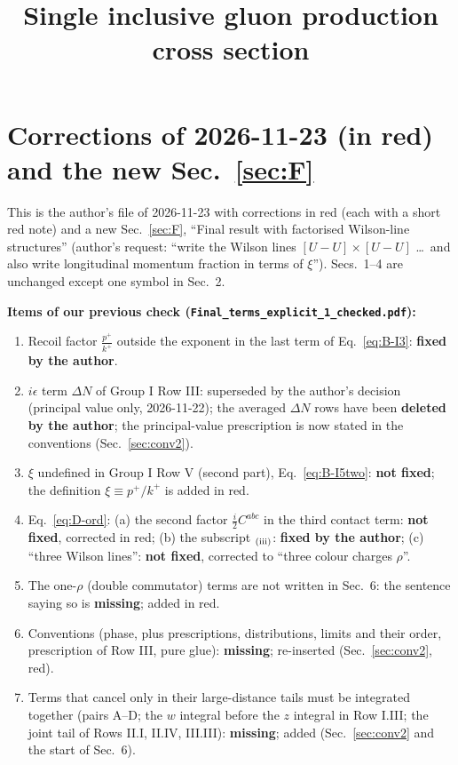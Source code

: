\documentclass[9pt]{article}
\title{Single inclusive gluon production cross section}
\author{}
\date{}
\numberwithin{equation}{section}
\begin{document}
\maketitle
{\color{red}
\section*{Corrections of 2026-11-23 (in red) and the new Sec.~\ref{sec:F}}
\noindent This is the author's file of 2026-11-23 with corrections in red (each with a short red note) and a new Sec.~\ref{sec:F}, ``Final result with factorised Wilson-line structures'' (author's request: ``write the Wilson lines $[U-U]\times[U-U]$ \dots\ and also write longitudinal momentum fraction in terms of $\xi$''). Secs.~1--4 are unchanged except one symbol in Sec.~2.

\noindent\textbf{Items of our previous check (\texttt{Final\_terms\_explicit\_1\_checked.pdf}):}
\begin{enumerate}
\item Recoil factor $\frac{p^{+}}{k^{+}}$ outside the exponent in the last term of Eq.~\eqref{eq:B-I3}: \textbf{fixed by the author}.
\item $i\epsilon$ term $\Delta N$ of Group I Row III: superseded by the author's decision (principal value only, 2026-11-22); the averaged $\Delta N$ rows have been \textbf{deleted by the author}; the principal-value prescription is now stated in the conventions (Sec.~\ref{sec:conv2}).
\item $\xi$ undefined in Group I Row V (second part), Eq.~\eqref{eq:B-I5two}: \textbf{not fixed}; the definition $\xi\equiv p^{+}/k^{+}$ is added in red.
\item Eq.~\eqref{eq:D-ord}: (a) the second factor $\frac{i}{2}C^{abc}$ in the third contact term: \textbf{not fixed}, corrected in red; (b) the subscript ${}_{\rm (iii)}$: \textbf{fixed by the author}; (c) ``three Wilson lines'': \textbf{not fixed}, corrected to ``three colour charges $\rho$''.
\item The one-$\rho$ (double commutator) terms are not written in Sec.~6: the sentence saying so is \textbf{missing}; added in red.
\item Conventions (phase, plus prescriptions, distributions, limits and their order, prescription of Row III, pure glue): \textbf{missing}; re-inserted (Sec.~\ref{sec:conv2}, red).
\item Terms that cancel only in their large-distance tails must be integrated together (pairs A--D; the $w$ integral before the $z$ integral in Row I.III; the joint tail of Rows II.I, II.IV, III.III): \textbf{missing}; added (Sec.~\ref{sec:conv2} and the start of Sec.~6).

\end{enumerate}}
\end{document}
